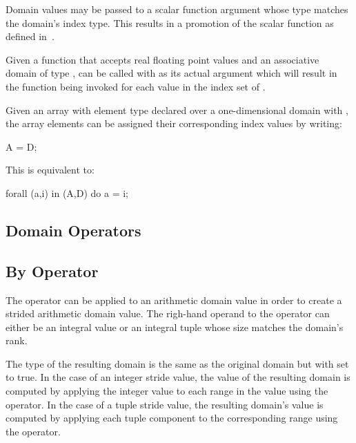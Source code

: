Domain values may be passed to a scalar function argument whose type
matches the domain's index type.  This results in a promotion of the
scalar function as defined in~.

\begin{example}
Given a function  that accepts real floating point values
and an associative domain  of
type ,  can be called with  as
its actual argument which will result in the function being invoked
for each value in the index set of .
\end{example}

\begin{example}
Given an array  with element type  declared over a
one-dimensional domain  with  , the
array elements can be assigned their corresponding index values by
writing:
\begin{chapel}
A = D;
\end{chapel}
This is equivalent to:
\begin{chapel}
forall (a,i) in (A,D) do
  a = i;
\end{chapel}
\end{example}


\subsection{Domain Operators}

\subsection{By Operator}
\label{By_Operator_For_Domains}

The  operator can be applied to an arithmetic domain value in
order to create a strided arithmetic domain value.  The righ-hand
operand to the  operator can either be an integral value or
an integral tuple whose size matches the domain's rank.


The type of the resulting domain is the same as the original domain
but with  set to true.  In the case of an integer
stride value, the value of the resulting domain is computed by
applying the integer value to each range in the value using the
 operator.  In the case of a tuple stride value, the resulting
domain's value is computed by applying each tuple component to the
corresponding range using the  operator.



